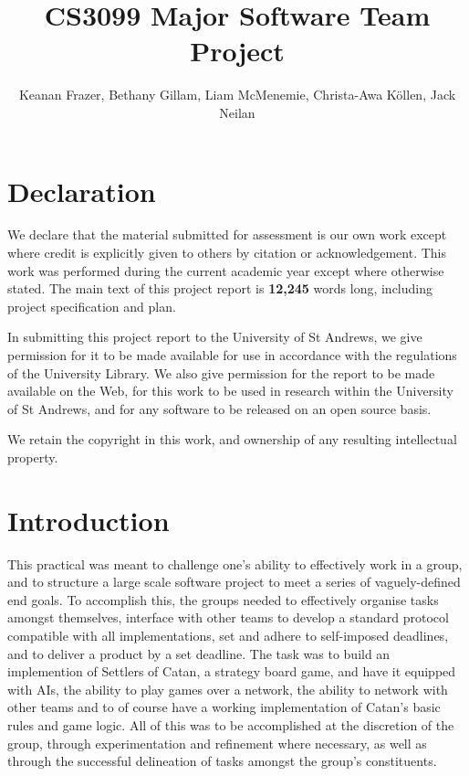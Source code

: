 \documentclass[a4paper,doc]{apa6}
\title{CS3099 Major Software Team Project}
\author{Keanan Frazer, Bethany Gillam, Liam McMenemie, Christa-Awa Köllen, Jack Neilan}
\affiliation{University of St Andrews}
\begin{document}
\maketitle




\section{Declaration}
We declare that the material submitted for assessment is our own work except where credit is explicitly given to others by citation or acknowledgement. This work was performed during the current academic year except where otherwise stated. The main text of this project report is \textbf{12,245} words long, including project specification and plan.

In submitting this project report to the University of St Andrews, we give permission for it to be made available for use in accordance with the regulations of the University Library. We also give permission for the report to be made available on the Web, for this work to be used in research within the University of St Andrews, and for any software to be released on an open source basis.

We retain the copyright in this work, and ownership of any resulting intellectual property.



\newpage
\tableofcontents
\newpage



\section{Introduction}
This practical was meant to challenge one’s ability to effectively work in a group, and to structure a large scale software project to meet a series of vaguely-defined end goals. To accomplish this, the groups needed to effectively organise tasks amongst themselves, interface with other teams to develop a standard protocol compatible with all implementations, set and adhere to self-imposed deadlines, and to deliver a product by a set deadline. The task was to build an implemention of Settlers of Catan, a strategy board game, and have it equipped with AIs, the ability to play games over a network, the ability to network with other teams and to of course have a working implementation of Catan’s basic rules and game logic. All of this was to be accomplished at the discretion of the group, through experimentation and refinement where necessary, as well as through the successful delineation of tasks amongst the group’s constituents.
\end{document}
